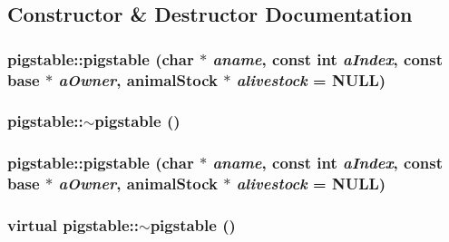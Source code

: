 \subsection{Constructor \& Destructor Documentation}
\hypertarget{classpigstable_a364d33fa370fb478387009b95dae4cea}{
\subsubsection[{pigstable}]{\setlength{\rightskip}{0pt plus 5cm}pigstable::pigstable (char $\ast$ {\em aname}, \/  const int {\em aIndex}, \/  const {\bf base} $\ast$ {\em aOwner}, \/  {\bf animalStock} $\ast$ {\em alivestock} = {\ttfamily NULL})}}
\label{classpigstable_a364d33fa370fb478387009b95dae4cea}
\hypertarget{classpigstable_a938464fcff82c03e1597eda101754d8e}{
\subsubsection[{$\sim$pigstable}]{\setlength{\rightskip}{0pt plus 5cm}pigstable::$\sim$pigstable ()}}
\label{classpigstable_a938464fcff82c03e1597eda101754d8e}
\hypertarget{classpigstable_a364d33fa370fb478387009b95dae4cea}{
\subsubsection[{pigstable}]{\setlength{\rightskip}{0pt plus 5cm}pigstable::pigstable (char $\ast$ {\em aname}, \/  const int {\em aIndex}, \/  const {\bf base} $\ast$ {\em aOwner}, \/  {\bf animalStock} $\ast$ {\em alivestock} = {\ttfamily NULL})}}
\label{classpigstable_a364d33fa370fb478387009b95dae4cea}
\hypertarget{classpigstable_a6295ed8b464d850128818d052a29bcb7}{
\subsubsection[{$\sim$pigstable}]{\setlength{\rightskip}{0pt plus 5cm}virtual pigstable::$\sim$pigstable ()}}
\label{classpigstable_a6295ed8b464d850128818d052a29bcb7}


